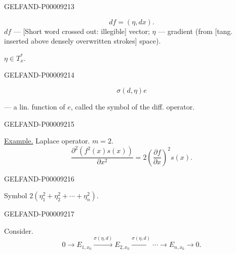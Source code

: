 \begin{GelfandAdjacentEvidence}{GELFAND-P000092}{13}

\begin{equation*}df=(\eta,dx).\end{equation*}
$df$ — [Short word crossed out: illegible] vector; $\eta$ — gradient (from [tang. inserted above densely overwritten strokes] space).

$\eta\in T_x^*$.
\end{GelfandAdjacentEvidence}
\begin{GelfandAdjacentEvidence}{GELFAND-P000092}{14}

\begin{equation*}\sigma(d,\eta)e\end{equation*}

— a lin. function of $e$, called the symbol of the diff. operator.
\end{GelfandAdjacentEvidence}
\begin{GelfandAdjacentEvidence}{GELFAND-P000092}{15}

\underline{Example.} Laplace operator. $m=2$.
\begin{equation*}
\frac{\partial^2(f^2(x)s(x))}{\partial x^2}
=2\left(\frac{\partial f}{\partial x}\right)^2s(x).
\end{equation*}
\end{GelfandAdjacentEvidence}
\begin{GelfandAdjacentEvidence}{GELFAND-P000092}{16}

Symbol $2(\eta_1^2+\eta_2^2+\cdots+\eta_n^2)$.
\end{GelfandAdjacentEvidence}
\begin{GelfandAdjacentEvidence}{GELFAND-P000092}{17}

Consider.
\begin{equation*}
0\longrightarrow E_{1,x_0}\overset{\sigma(\eta,d)}{\longrightarrow}E_{2,x_0}
\overset{\sigma(\eta,d)}{\longrightarrow}\cdots\longrightarrow E_{n,x_0}\longrightarrow0.
\end{equation*}
\end{GelfandAdjacentEvidence}
